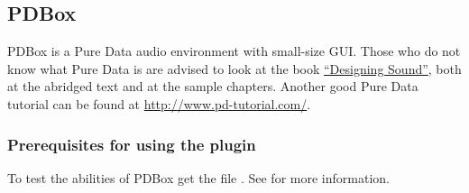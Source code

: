\subsection{PDBox}

PDBox is a Pure Data audio environment with small-size GUI. Those who do not know
what Pure Data is are advised to look at the book \href{http://aspress.co.uk/ds/}
{``Designing Sound''}, both at the abridged text and at the sample chapters.
Another good Pure Data tutorial can be found at \url{http://www.pd-tutorial.com/}.

\subsubsection{Prerequisites for using the plugin}
To test the abilities of PDBox get the file
\href{https://www.rockbox.org/wiki/pub/Main/PureDataOnRockbox/PureData.zip}
{}. See  for more information.
